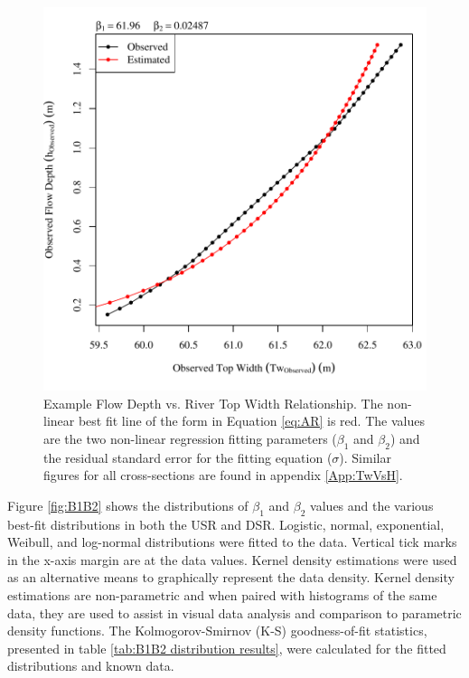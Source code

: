 \begin{linenumbers}
\begin{figure}[htbp]
\begin{center}
	\includegraphics[width=6in]{"Figures/Results_USR/Survey Tw vs H-Section 2"}
	\caption[Example Flow Depth vs. River Top Width Relationship.]{Example Flow Depth vs. River Top Width Relationship.  The non-linear best fit line of the form in Equation \ref{eq:AR} is red.  The values are the two non-linear regression fitting parameters ($\beta_1$ and $\beta_2$) and the residual standard error for the fitting equation ($\sigma$).  Similar figures for all cross-sections are found in appendix \ref{App:TwVsH}.}
	\label{fig:exampleTwVsH}
\end{center}
\end{figure}

Figure \ref{fig:B1B2} shows the distributions of $\beta_1$ and $\beta_2$ values and the various best-fit distributions in both the USR and DSR.  Logistic, normal, exponential, Weibull, and log-normal distributions were fitted to the data.  Vertical tick marks in the x-axis margin are at the data values.  Kernel density estimations were used as an alternative means to graphically represent the data density.  Kernel density estimations are non-parametric and when paired with histograms of the same data, they are used to assist in visual data analysis and comparison to parametric density functions.  The Kolmogorov-Smirnov (K-S) goodness-of-fit statistics, presented in table \ref{tab:B1B2 distribution results}, were calculated for the fitted distributions and known data.


\end{linenumbers}
